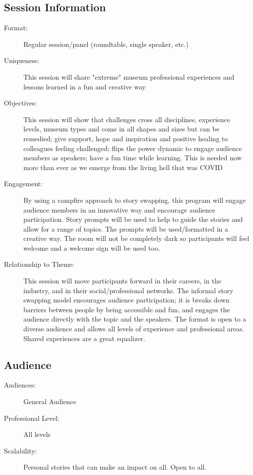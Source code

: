\documentclass{report}
\begin{document}
              \subsection*{Session Information}
                \begin{description}
                  \item [Format:] Regular session/panel (roundtable, single speaker, etc.)
							    
							    \item [Uniqueness:]This session will share "extreme" museum professional experiences and lessons learned in a fun and creative way
							    \item [Objectives:]This session will show that challenges cross all disciplines, experience levels, museum types and come in all shapes and sizes but can be remedied; give support, hope and inspiration and positive healing to colleagues feeling challenged; flips the power dynamic to engage audience members as speakers; have a fun time while learning. This is needed now more than ever as we emerge from the living hell that was COVID
							    \item [Engagement:]By using a campfire approach to story swapping, this program will engage audience members in an innovative way and encourage audience participation. Story prompts will be used to help to guide the stories and allow for a range of topics. The prompts will be used/formatted in a creative way. The room will not be completely dark so participants will feel welcome and a welcome sign will be used too.
							    \item [Relationship to Theme:]This session will move participants forward in their careers, in the industry, and in their social/professional networks. The informal story swapping model encourages audience participation; it is breaks down barriers between people by being accessible and fun, and engages the audience directly with the topic and the speakers. The format is open to a diverse audience and allows all levels of experience and professional areas. Shared experiences are a great equalizer.
							    
                \end{description}
              \subsection*{Audience}
                \begin{description}
                  \item [Audiences:]General Audience~
                  \item[Professional Level:]All levels~
                \item[Scalability:] Personal stories that can make an impact on all. Open to all.

							
              \end{description}
\end{document}

